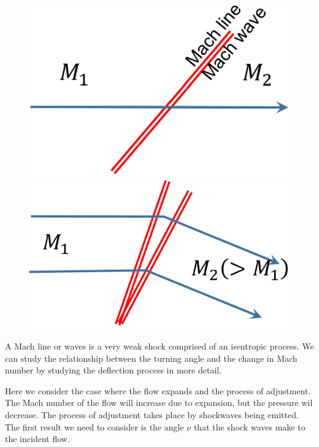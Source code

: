\begin{figure}[H]
    \centering
    \begin{minipage}{.5\textwidth}
        \centering
        \includegraphics[width=.8\linewidth]{./img/diagram22.png}
    \end{minipage}%
    \begin{minipage}{.5\textwidth}
        \centering
        \includegraphics[width=.8\linewidth]{./img/diagram23.png}
    \end{minipage}
\end{figure}
A Mach line or waves is a very weak shock comprised of an isentropic process. We can study the relationship between the turning angle and the change in Mach number by studying the deflection process in more detail.

Here we consider the case where the flow expands and the process of adjustment. The Mach number of the flow will increase due to expansion, but the pressure wil decrease. The process of adjustment takes place by shockwaves being emitted. The first result we need to consider is the angle $\nu$ that the shock waves make to the incident flow.
